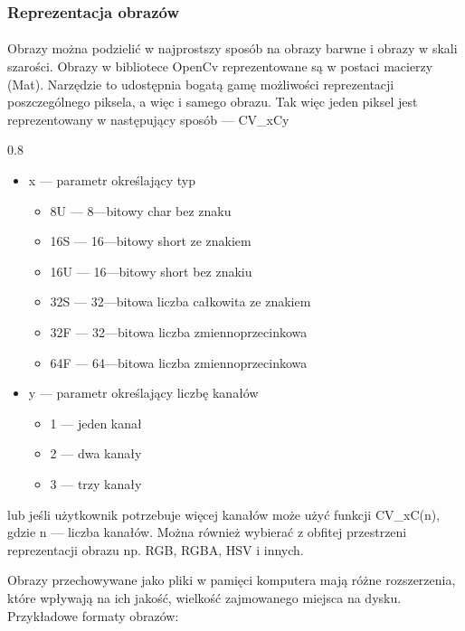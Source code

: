 \documentclass[a4paper,12pt]{article}
\newcommand\spacingInSimpleItemize{0.8}
\begin{document}
    	\subsubsection{Reprezentacja obrazów}
			\paragraph{\indent} Obrazy można podzielić w najprostszy sposób na obrazy barwne i obrazy w skali szarości. Obrazy w bibliotece OpenCv 
				reprezentowane są w postaci macierzy (Mat). Narzędzie to udostępnia bogatą gamę możliwości reprezentacji poszczególnego piksela, 
				a więc i samego obrazu. Tak więc jeden piksel jest reprezentowany w następujący sposób --- CV\_xCy
			
				\begin{spacing}{\spacingInSimpleItemize}
					\begin{itemize}
						\item{x --- parametr określający typ}
							\begin{itemize}
								\item{8U --- 8---bitowy char bez znaku}
								\item{16S --- 16---bitowy short ze znakiem}
								\item{16U --- 16---bitowy short bez znakiu}
								\item{32S --- 32---bitowa liczba całkowita ze znakiem}
								\item{32F --- 32---bitowa liczba zmiennoprzecinkowa}
								\item{64F --- 64---bitowa liczba zmiennoprzecinkowa}
							\end{itemize}
						\item{y  --- parametr określający liczbę kanałów}
							\begin{itemize}
								\item{1 --- jeden kanał}
								\item{2 --- dwa kanały}
								\item{3 --- trzy kanały}
							\end{itemize}
					\end{itemize}	
				\end{spacing}
			
				lub jeśli użytkownik potrzebuje więcej kanałów może użyć funkcji CV\_xC(n), gdzie n --- liczba kanałów. Można również wybierać 
				z obfitej przestrzeni reprezentacji obrazu np. RGB, RGBA, HSV i innych. 
			\par Obrazy przechowywane jako pliki w pamięci komputera mają różne rozszerzenia, które wpływają na ich jakość, 
				wielkość zajmowanego miejsca na dysku. Przykładowe formaty obrazów: 
			
\end{document}
